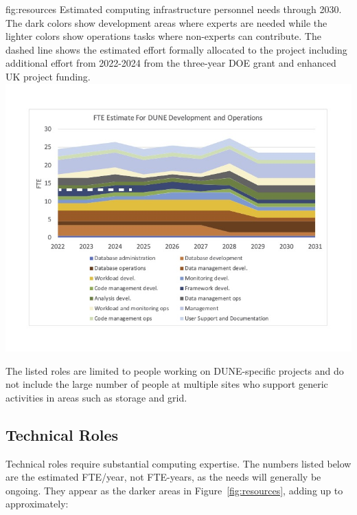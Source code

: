 \documentclass[../main-v1.tex]{subfiles}
\begin{document}
\begin{dunefigure}
{fig:resources}
{Estimated computing infrastructure personnel needs through 2030.  The dark colors show development areas where experts are needed while the lighter colors show operations tasks where non-experts can contribute. The dashed line shows the estimated effort formally allocated to the project including additional effort from 2022-2024 from the three-year DOE grant and enhanced UK project funding.}
{\includegraphics[width=0.9 \textwidth]{graphics/Resources/FTENeeds-2022-03.jpg}}
\end{dunefigure}

The listed roles are limited to people working on DUNE-specific projects and do not include the large number of people at multiple sites who support generic activities in areas such as storage and grid.  


\subsection{Technical Roles}
\label{subsec:coll-org:Tech}

Technical roles require substantial computing expertise. The numbers listed below are the estimated FTE/year, not FTE-years, as the needs will generally be ongoing.  They appear as the darker areas in Figure~\ref{fig:resources}, adding up to approximately: 
\end{document}

